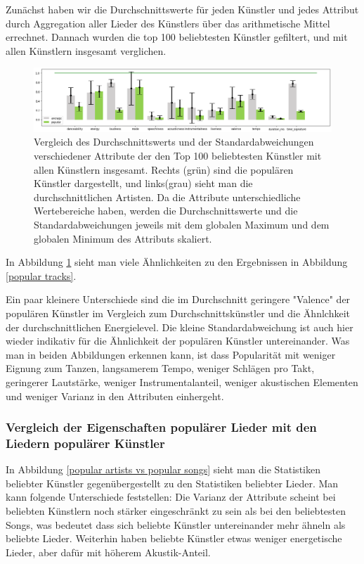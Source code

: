 \documentclass[conference]{IEEEtran}
\begin{document}
Zunächst haben wir die Durchschnittswerte für jeden Künstler und jedes Attribut durch Aggregation aller Lieder des Künstlers über das arithmetische Mittel errechnet. Dannach wurden die top 100 beliebtesten Künstler gefiltert, und mit allen Künstlern insgesamt verglichen.

\begin{figure}[t]
\centering
\includegraphics[width=\textwidth]{images/pop_arts.png}
\caption{Vergleich des Durchschnittswerts und der Standardabweichungen verschiedener Attribute der den Top 100 beliebtesten Künstler mit allen Künstlern insgesamt. Rechts (grün) sind die populären Künstler dargestellt, und links(grau) sieht man die durchschnittlichen Artisten. Da die Attribute unterschiedliche Wertebereiche haben, werden die Durchschnittswerte und die Standardabweichungen jeweils mit dem globalen Maximum und dem globalen Minimum des Attributs skaliert.}
\label{popular artists}
\end{figure}
In Abbildung \ref{popular artists} sieht man viele Ähnlichkeiten zu den Ergebnissen in Abbildung \ref{popular tracks}.

Ein paar kleinere Unterschiede sind die im Durchschnitt geringere "Valence" der populären Künstler im Vergleich zum Durchschnittskünstler und die Ähnlchkeit der durchschnittlichen Energielevel. Die kleine Standardabweichung ist auch hier wieder indikativ für die Ähnlichkeit der populären Künstler untereinander.
Was man in beiden Abbildungen erkennen kann, ist dass Popularität mit weniger Eignung zum Tanzen, langsamerem Tempo, weniger Schlägen pro Takt, geringerer Lautstärke, weniger Instrumentalanteil, weniger akustischen Elementen und weniger Varianz in den Attributen einhergeht.

\subsubsection{Vergleich der Eigenschaften populärer Lieder mit den Liedern populärer Künstler}
In Abbildung \ref{popular artists vs popular songs} sieht man die Statistiken beliebter Künstler gegenübergestellt zu den Statistiken beliebter Lieder. Man kann folgende Unterschiede feststellen: Die Varianz der Attribute scheint bei beliebten Künstlern noch stärker eingeschränkt zu sein als bei den beliebtesten Songs, was bedeutet dass sich beliebte Künstler untereinander mehr ähneln als beliebte Lieder. Weiterhin haben beliebte Künstler etwas weniger energetische Lieder, aber dafür mit höherem Akustik-Anteil.
\end{document}
